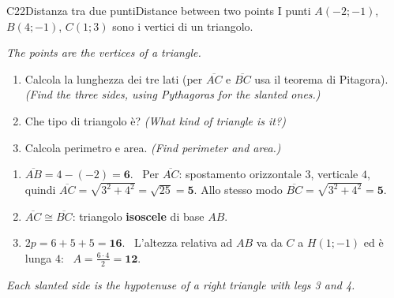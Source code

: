 \documentclass[11pt,a4paper]{article}
\newcommand{\en}[1]{\par{\small\itshape\color{engray}#1\par}}
\newcommand{\enx}[1]{{\small\itshape\color{engray}(#1)}}
\newcommand{\seg}[1]{\overline{#1}}
\begin{document}
\begin{esercizio}{C2}{2}{Distanza tra due punti}{Distance between two points}
I punti $A(-2;-1)$, $B(4;-1)$, $C(1;3)$ sono i vertici di un triangolo.
\en{The points are the vertices of a triangle.}
\begin{enumerate}
\item Calcola la lunghezza dei tre lati (per $\seg{AC}$ e $\seg{BC}$ usa il teorema di Pitagora). \enx{Find the three sides, using Pythagoras for the slanted ones.}
\item Che tipo di triangolo è? \enx{What kind of triangle is it?}
\item Calcola perimetro e area. \enx{Find perimeter and area.}
\end{enumerate}
\end{esercizio}
\begin{solbox}
\begin{minipage}{0.55\linewidth}
\begin{enumerate}
\item $\seg{AB}=4-(-2)=\mathbf{6}$. \ Per $\seg{AC}$: spostamento orizzontale $3$, verticale $4$, quindi $\seg{AC}=\sqrt{3^2+4^2}=\sqrt{25}=\mathbf{5}$. Allo stesso modo $\seg{BC}=\sqrt{3^2+4^2}=\mathbf{5}$.
\item $\seg{AC}\cong\seg{BC}$: triangolo \textbf{isoscele} di base $AB$.
\item $2p=6+5+5=\mathbf{16}$. \ L'altezza relativa ad $AB$ va da $C$ a $H(1;-1)$ ed è lunga $4$: \ $A=\frac{6\cdot4}{2}=\mathbf{12}$.
\end{enumerate}
\en{Each slanted side is the hypotenuse of a right triangle with legs 3 and 4.}
\end{minipage}\hfill
\begin{minipage}{0.42\linewidth}\centering
{}
\end{minipage}
\end{solbox}
\end{document}
